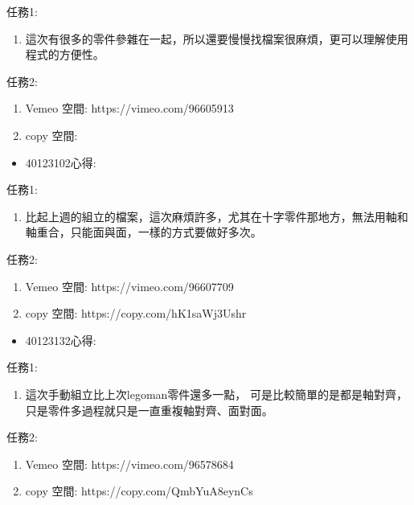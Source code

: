 \documentclass[]{article}
\begin{document}
任務1:

\begin{enumerate}
\def\labelenumi{\arabic{enumi}.}
\itemsep1pt\parskip0pt
\item
  這次有很多的零件參雜在一起，所以還要慢慢找檔案很麻煩，更可以理解使用程式的方便性。
\end{enumerate}

任務2:

\begin{enumerate}
\def\labelenumi{\arabic{enumi}.}
\item
  Vemeo 空間: https://vimeo.com/96605913
\item
  copy 空間:
\end{enumerate}

\begin{itemize}
\itemsep1pt\parskip0pt
\item
  40123102心得:
\end{itemize}

任務1:

\begin{enumerate}
\def\labelenumi{\arabic{enumi}.}
\itemsep1pt\parskip0pt
\item
  比起上週的組立的檔案，這次麻煩許多，尤其在十字零件那地方，無法用軸和軸重合，只能面與面，一樣的方式要做好多次。
\end{enumerate}

任務2:

\begin{enumerate}
\def\labelenumi{\arabic{enumi}.}
\item
  Vemeo 空間: https://vimeo.com/96607709
\item
  copy 空間: https://copy.com/hK1saWj3Ushr
\end{enumerate}

\begin{itemize}
\itemsep1pt\parskip0pt
\item
  40123132心得:
\end{itemize}

任務1:

\begin{enumerate}
\def\labelenumi{\arabic{enumi}.}
\itemsep1pt\parskip0pt
\item
  這次手動組立比上次legoman零件還多一點， 可是比較簡單的是都是軸對齊，
  只是零件多過程就只是一直重複軸對齊、面對面。
\end{enumerate}

任務2:

\begin{enumerate}
\def\labelenumi{\arabic{enumi}.}
\item
  Vemeo 空間: https://vimeo.com/96578684
\item
  copy 空間: https://copy.com/QmbYuA8eynCs
\end{enumerate}
\end{document}
